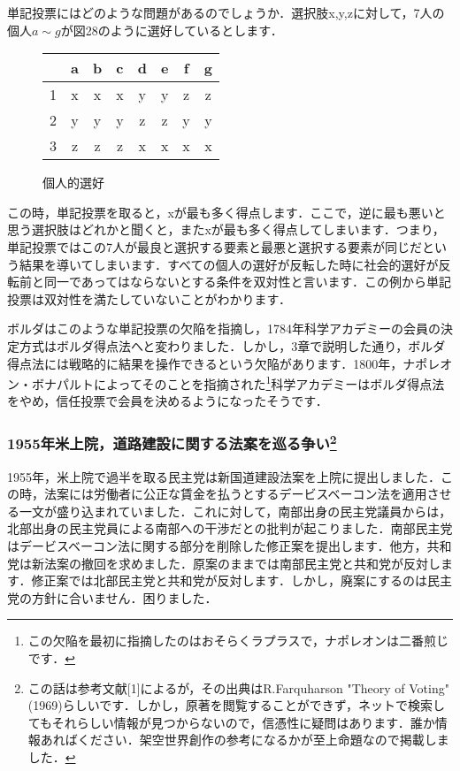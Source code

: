 単記投票にはどのような問題があるのでしょうか．選択肢x,y,zに対して，7人の個人$a\sim g$が図28のように選好しているとします．
\begin{figure}[!h]
    \centering
    \begin{tabular}[!h]{|c|c|c|c|c|c|c|c|} \hline
         & a & b & c & d & e & f & g \\ \hline
        1 & x & x & x & y & y & z & z \\ \hline
        2 & y & y & y & z & z & y & y \\ \hline
        3 & z & z & z & x & x & x & x \\ \hline
    \end{tabular}
    \caption{個人的選好}
\end{figure}
この時，単記投票を取ると，xが最も多く得点します．ここで，逆に最も悪いと思う選択肢はどれかと聞くと，またxが最も多く得点してしまいます．つまり，単記投票ではこの7人が最良と選択する要素と最悪と選択する要素が同じだという結果を導いてしまいます．すべての個人の選好が反転した時に社会的選好が反転前と同一であってはならないとする条件を双対性と言います．この例から単記投票は双対性を満たしていないことがわかります．

ボルダはこのような単記投票の欠陥を指摘し，1784年科学アカデミーの会員の決定方式はボルダ得点法へと変わりました．しかし，3章で説明した通り，ボルダ得点法には戦略的に結果を操作できるという欠陥があります．1800年，ナポレオン・ボナパルトによってそのことを指摘された\footnote{この欠陥を最初に指摘したのはおそらくラプラスで，ナポレオンは二番煎じです．}科学アカデミーはボルダ得点法をやめ，信任投票で会員を決めるようになったそうです．  

\subsubsection*{1955年米上院，道路建設に関する法案を巡る争い\footnote{
    この話は参考文献[1]によるが，その出典はR.Farquharson "Theory of Voting" (1969)らしいです．しかし，原著を閲覧することができず，ネットで検索してもそれらしい情報が見つからないので，信憑性に疑問はあります．誰か情報あればください．架空世界創作の参考になるかが至上命題なので掲載しました．
}}
1955年，米上院で過半を取る民主党は新国道建設法案を上院に提出しました．この時，法案には労働者に公正な賃金を払うとするデービスベーコン法を適用させる一文が盛り込まれていました．これに対して，南部出身の民主党議員からは，北部出身の民主党員による南部への干渉だとの批判が起こりました．南部民主党はデービスベーコン法に関する部分を削除した修正案を提出します．他方，共和党は新法案の撤回を求めました．原案のままでは南部民主党と共和党が反対します．修正案では北部民主党と共和党が反対します．しかし，廃案にするのは民主党の方針に合いません．困りました．

